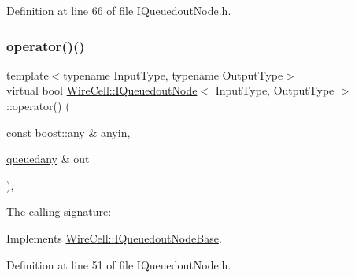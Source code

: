 Definition at line 66 of file I\+Queuedout\+Node.\+h.

\mbox{\label{class_wire_cell_1_1_i_queuedout_node_a38fcceec4026ddc65245206b24e62265}} 
\subsubsection{\texorpdfstring{operator()()}{operator()()}\hspace{0.1cm}{\footnotesize\ttfamily [1/2]}}
{\footnotesize\ttfamily template$<$typename Input\+Type, typename Output\+Type$>$ \\
virtual bool \hyperlink{class_wire_cell_1_1_i_queuedout_node}{Wire\+Cell\+::\+I\+Queuedout\+Node}$<$ Input\+Type, Output\+Type $>$\+::operator() (\begin{DoxyParamCaption}\item[{const boost\+::any \&}]{anyin,  }\item[{\hyperlink{class_wire_cell_1_1_i_queuedout_node_base_a9c144f13ef75e051847fe22888977a11}{queuedany} \&}]{out }\end{DoxyParamCaption})\hspace{0.3cm}{\ttfamily [inline]}, {\ttfamily [virtual]}}



The calling signature\+: 



Implements \hyperlink{class_wire_cell_1_1_i_queuedout_node_base_ad3723d92a4594fc9e3d6718fc0de9b1c}{Wire\+Cell\+::\+I\+Queuedout\+Node\+Base}.



Definition at line 51 of file I\+Queuedout\+Node.\+h.

\mbox{\label{class_wire_cell_1_1_i_queuedout_node_a0c00d8011d718b474984287133d5841a}} 
